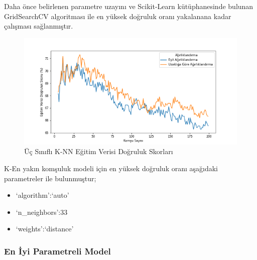 \documentclass[12pt,twoside]{deuthesis}
\providecommand{\tightlist}{%
  \setlength{\itemsep}{0pt}\setlength{\parskip}{0pt}}
\begin{document}
Daha önce belirlenen parametre uzayını ve Scikit-Learn kütüphanesinde bulunan GridSearchCV algoritması ile en yüksek doğruluk oranı yakalanana kadar çalışması sağlanmıştır.
\begin{figure}

{\centering \includegraphics[width=1.1\linewidth,height=0.55\textheight]{figure/KNN_Grid_Graph} 

}

\caption{Üç Sınıflı K-NN Eğitim Verisi Doğruluk Skorları}\label{fig:unnamed-chunk-21}
\end{figure}
K-En yakın komşuluk modeli için en yüksek doğruluk oranı aşağıdaki parametreler ile bulunmuştur;
\begin{itemize}
\tightlist
\item
  `algorithm':`auto'
\item
  `n\_neighbors':33
\item
  `weights':`distance'
\end{itemize}
\newpage

\hypertarget{en-iyi-parametreli-model}{%
\subsubsection{En İyi Parametreli Model}\label{en-iyi-parametreli-model}}
\end{document}
